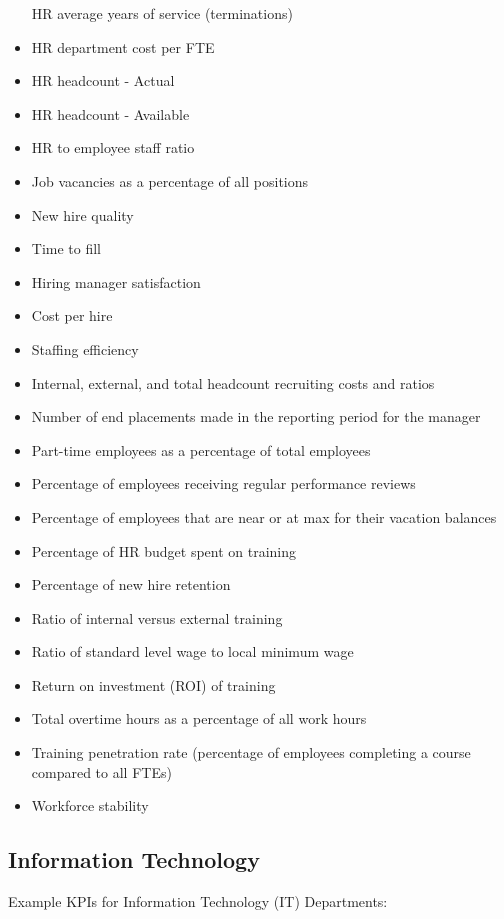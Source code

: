 \documentclass[]{book}
\begin{document}
\begin{itemize}
  HR average years of service (terminations)
\item
  HR department cost per FTE
\item
  HR headcount - Actual
\item
  HR headcount - Available
\item
  HR to employee staff ratio
\item
  Job vacancies as a percentage of all positions
\item
  New hire quality
\item
  Time to fill
\item
  Hiring manager satisfaction
\item
  Cost per hire
\item
  Staffing efficiency
\item
  Internal, external, and total headcount recruiting costs and ratios
\item
  Number of end placements made in the reporting period for the manager
\item
  Part-time employees as a percentage of total employees
\item
  Percentage of employees receiving regular performance reviews
\item
  Percentage of employees that are near or at max for their vacation
  balances
\item
  Percentage of HR budget spent on training
\item
  Percentage of new hire retention
\item
  Ratio of internal versus external training
\item
  Ratio of standard level wage to local minimum wage
\item
  Return on investment (ROI) of training
\item
  Total overtime hours as a percentage of all work hours
\item
  Training penetration rate (percentage of employees completing a course
  compared to all FTEs)
\item
  Workforce stability
\end{itemize}

\subsection{Information Technology}\label{information-technology}

Example KPIs for Information Technology (IT) Departments:
\end{document}
